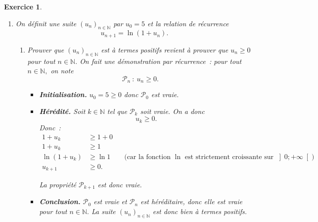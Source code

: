 \documentclass[10pt]{article}
\newtheorem{exo}{Exercice}
\begin{document}
\begin{exo}
\begin{enumerate}
\begin{enumerate}
\item Pour étudier la convexité, on utilise la dérivée seconde. On sait déjà que $f'(x)=\frac{1}{1+x}$ pour tout $x\in\left[0;+\infty\right[.$ On utilise donc la formule $\left(\frac{1}{u}\right)'=-\frac{u'}{u^2},$ avec
\[u(x)=1+x,\qquad u'(x)=1.\] Pour tout $x\in\left[0;+\infty\right[~:$
\[f''(x)=-\frac{1}{(x+1)^2}.\]

\medskip

La dérivée seconde est clairement strictement négative sur $\left[0;+\infty\right[,$ donc $f$ est concave sur cet intervalle. D'après une propriété du cours de début d'année, la tangente $(T)$ est au dessus de $(C)$ sur $\left[0;+\infty\right[.$ Autrement dit, pour tout $x\in \left[0;+\infty\right[~:$
\[\ln(1+x)\leq x.\]
\end{enumerate}
\item On définit une suite $(u_n)_{n\in\mathbb{N}}$ par $u_0=5$ et la relation de récurrence \[u_{n+1}=\ln\left(1+u_n\right).\]
\begin{enumerate}
\item Prouver que $(u_n)_{n\in\mathbb{N}}$ est à termes positifs revient à prouver que $u_n\geq 0$ pour tout $n\in\mathbb{N}.$ On fait une démonstration par récurrence~: pour tout $n\in\mathbb{N},$ on note 
\[\mathcal{P}_n~:~u_n\geq 0.\]

\begin{itemize}
\item[\textbullet] \textbf{Initialisation.} $u_0=5\geq 0$ donc $\mathcal{P}_0$ est vraie.


\item[\textbullet] \textbf{Hérédité.} Soit $k\in\mathbb{N}$ tel que $\mathcal{P}_k$ soit vraie. On a donc \[u_k\geq 0.\] Donc~:
\begin{align*}
1+u_k&\geq 1+0\\
1+u_k&\geq 1\\
\ln\left(1+u_k\right)&\geq \ln 1\qquad \text{(car la fonction $\ln$ est strictement croissante sur $\left]0;+\infty\right[$)}\\
u_{k+1}&\geq 0.
\end{align*}

La propriété $\mathcal{P}_{k+1}$ est donc vraie.


\item[\textbullet] \textbf{Conclusion.} $\mathcal{P}_0$ est vraie et $\mathcal{P}_n$ est héréditaire, donc elle est vraie pour tout $n\in \mathbb{N}.$ La suite $(u_n)_{n\in\mathbb{N}}$ est donc bien à termes positifs.


\end{itemize}
\end{enumerate}
\end{enumerate}
\end{exo}
\end{document}
